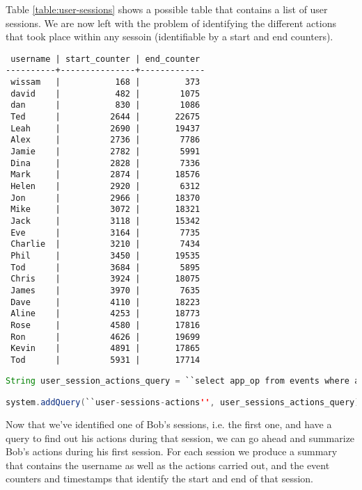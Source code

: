 Table \ref{table:user-sessions} shows a possible table that contains a list of user sessions. We are now left with the problem of identifying the different actions that took place within any sessoin (identifiable by a start and end counters).

\begin{table}
\begin{verbatim}
 username | start_counter | end_counter 
----------+---------------+-------------
 wissam   |           168 |         373
 david    |           482 |        1075
 dan      |           830 |        1086
 Ted      |          2644 |       22675
 Leah     |          2690 |       19437
 Alex     |          2736 |        7786
 Jamie    |          2782 |        5991
 Dina     |          2828 |        7336
 Mark     |          2874 |       18576
 Helen    |          2920 |        6312
 Jon      |          2966 |       18370
 Mike     |          3072 |       18321
 Jack     |          3118 |       15342
 Eve      |          3164 |        7735
 Charlie  |          3210 |        7434
 Phil     |          3450 |       19535
 Tod      |          3684 |        5895
 Chris    |          3924 |       18075
 James    |          3970 |        7635
 Dave     |          4110 |       18223
 Aline    |          4253 |       18773
 Rose     |          4580 |       17816
 Ron      |          4626 |       19699
 Kevin    |          4891 |       17865
 Tod      |          5931 |       17714
\end{verbatim}
\caption*{User Sessions Table}
\caption[User Sessions]{This table shows start and end event counters for different user sessions. Start and end times are omitted for simplicity.}
\label{table:user-sessions}
\end{table}

\begin{lstlisting}[language=Java]
String user_session_actions_query = ``select app_op from events where app_op like 'mint-user-\%' and to_array(app_args)[0] = ? and event_counter > ? and event_counter < ?'';

system.addQuery(``user-sessions-actions'', user_sessions_actions_query);
\end{lstlisting}

Now that we've identified one of Bob's sessions, i.e. the first one, and have a query to find out his actions during that session, we can go ahead and summarize Bob's actions during his first session. For each session we produce a summary that contains the username as well as the actions carried out, and the event counters and timestamps that identify the start and end of that session.

